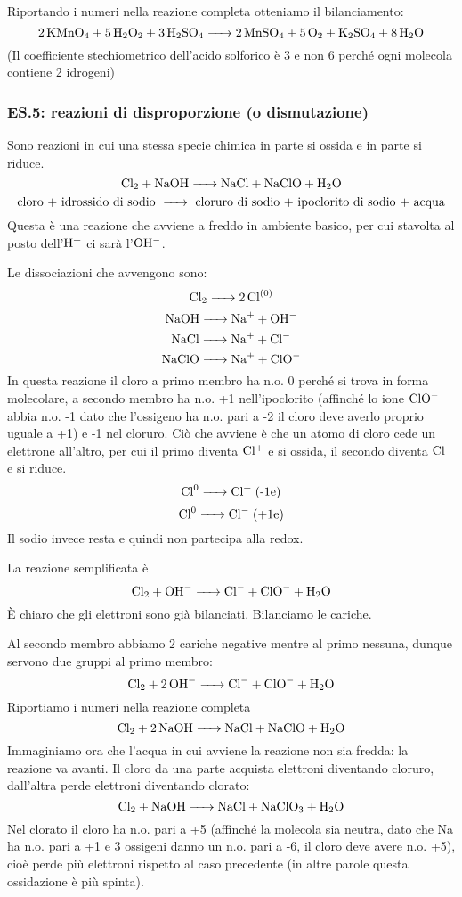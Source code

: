 Riportando i numeri nella reazione completa otteniamo il bilanciamento:
$$\ce{2KMnO_4 + 5H_2O_2 + 3H_2SO_4 -> 2MnSO_4 + 5O_2 + K_2SO_4 + 8H_2O}$$
(Il coefficiente stechiometrico dell'acido solforico è 3 e non 6 perché ogni molecola contiene 2 idrogeni)
\subsubsection{\textbf{ES.5: reazioni di disproporzione (o dismutazione)}}

Sono reazioni in cui una stessa specie chimica in parte si ossida e in parte si riduce.
$$\ce{Cl_2 + NaOH -> NaCl + NaClO + H_2O}$$
$$\text{cloro + idrossido di sodio \ce{->} cloruro di sodio + ipoclorito di sodio + acqua}$$
Questa è una reazione che avviene a freddo in ambiente basico, per cui stavolta al posto dell'$\rm H^+$ ci sarà l'$\rm OH^-$.

Le dissociazioni che avvengono sono:
$$\ce{Cl_2 -> 2Cl^{(0)}}$$
$$\ce{NaOH -> Na+ + OH-}$$
$$\ce{NaCl -> Na+ + Cl-}$$
$$\ce{NaClO -> Na+ + ClO-}$$
In questa reazione il cloro a primo membro ha n.o. 0 perché si trova in forma molecolare, a secondo membro ha n.o. +1 nell'ipoclorito (affinché lo ione $\rm ClO^-$ abbia n.o. -1 dato che l'ossigeno ha n.o. pari a -2 il cloro deve averlo proprio uguale a +1) e -1 nel cloruro. Ciò che avviene è che un atomo di cloro cede un elettrone all'altro, per cui il primo diventa $\rm Cl^+$ e si ossida, il secondo diventa $\rm Cl^-$ e si riduce.
$$\ce{Cl^0 -> Cl+} \; \text{(-1e)}$$
$$\ce{Cl^0 ->Cl-} \; \text{(+1e)}$$
Il sodio invece resta  e quindi non partecipa alla redox.

La reazione semplificata è
$$\ce{Cl_2 + OH- -> Cl- + ClO- + H_2O}$$
È chiaro che gli elettroni sono già bilanciati. Bilanciamo le cariche.

Al secondo membro abbiamo 2 cariche negative mentre al primo nessuna, dunque servono due gruppi  al primo membro:
$$\ce{Cl_2 + 2OH- -> Cl- + ClO- + H_2O}$$
Riportiamo i numeri nella reazione completa
$$\ce{Cl_2 + 2NaOH -> NaCl + NaClO + H_2O}$$
Immaginiamo ora che l'acqua in cui avviene la reazione non sia fredda: la reazione va avanti. Il cloro da una parte acquista elettroni diventando cloruro, dall'altra perde elettroni diventando clorato:
$$\ce{Cl_2 + NaOH -> NaCl + NaClO_3 + H_2O}$$
Nel clorato il cloro ha n.o. pari a +5 (affinché la molecola  sia neutra, dato che Na ha n.o. pari a +1 e 3 ossigeni danno un n.o. pari a -6, il cloro deve avere n.o. +5), cioè perde più elettroni rispetto al caso precedente (in altre parole questa ossidazione è più spinta).

